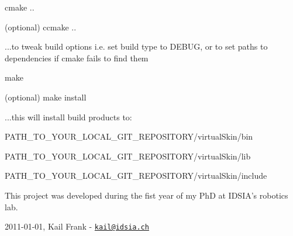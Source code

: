 \begin{DoxyEnumerate}
\begin{DoxyItemize}
\item \begin{DoxyVerb}cmake .. \end{DoxyVerb}

\item \begin{DoxyVerb}(optional) ccmake .. \end{DoxyVerb}
 ...to tweak build options i.e. set build type to DEBUG, or to set paths to dependencies if cmake fails to find them
\item \begin{DoxyVerb}make \end{DoxyVerb}

\item \begin{DoxyVerb}(optional) make install \end{DoxyVerb}
 ...this will install build products to:
\begin{DoxyItemize}
\item PATH\_\-TO\_\-YOUR\_\-LOCAL\_\-GIT\_\-REPOSITORY/virtualSkin/bin
\item PATH\_\-TO\_\-YOUR\_\-LOCAL\_\-GIT\_\-REPOSITORY/virtualSkin/lib
\item PATH\_\-TO\_\-YOUR\_\-LOCAL\_\-GIT\_\-REPOSITORY/virtualSkin/include
\end{DoxyItemize}
\end{DoxyItemize}
\end{DoxyEnumerate}This project was developed during the fist year of my PhD at IDSIA's robotics lab.

2011-\/01-\/01, Kail Frank -\/ \href{mailto:kail@idsia.ch}{\tt kail@idsia.ch} 